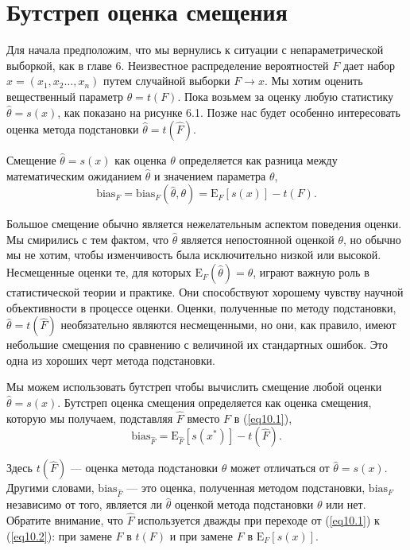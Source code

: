 \section{Бутстреп оценка смещения}

Для начала предположим, что мы вернулись к ситуации с непараметрической выборкой, как в главе 6. Неизвестное распределение вероятностей $F$ дает набор $x = (x_1, x_2 \dots, x_n)$ путем случайной выборки $F \rightarrow x$. Мы хотим оценить вещественный параметр $\theta = t(F)$. Пока возьмем за оценку любую статистику $\hat{\theta} = s(x)$, как показано на рисунке 6.1. Позже нас будет особенно интересовать оценка метода подстановки $\hat{\theta} = t(\hat{F})$.

Смещение $\hat{\theta} = s(x)$ как оценка $\theta$ определяется как разница между математическим ожиданием $\hat{\theta}$ и значением параметра $\theta$,
\begin{equation}\label{eq10.1} 
    \text{bias}_{F} = \text{bias}_{F}(\hat{\theta}, \theta) = \mathrm{E}_{F}[s(x)] - t(F).
\end{equation}

Большое смещение обычно является нежелательным аспектом поведения оценки. Мы смирились с тем фактом, что $\hat{\theta}$ является непостоянной оценкой $\theta$, но обычно мы не хотим, чтобы изменчивость была исключительно низкой или высокой. Несмещенные оценки те, для которых $\mathrm{E}_{F}(\hat{\theta}) = \theta$, играют важную роль в статистической теории и практике. Они способствуют хорошему чувству научной объективности в процессе оценки. Оценки, полученные по методу подстановки, $\hat{\theta} = t(\hat{F})$ необязательно являются несмещенными, но они, как правило, имеют небольшие смещения по сравнению с величиной их стандартных ошибок. Это одна из хороших черт метода подстановки.

Мы можем использовать бутстреп чтобы вычислить смещение любой оценки $\hat{\theta} = s(x)$. Бутстреп оценка смещения определяется как оценка смещения, которую мы получаем, подставляя $\hat{F}$ вместо $F$ в (\ref{eq10.1}),
\begin{equation}\label{eq10.2} 
    \text{bias}_{\hat{F}} = \mathrm{E}_{\hat{F}}[s(x^{*})] - t(\hat{F}).
\end{equation}

Здесь $t(\hat{F})$ --- оценка метода подстановки $\theta$ может отличаться от $\hat{\theta} = s(x)$. Другими словами, $\text{bias}_{\hat{F}}$ --- это оценка, полученная методом подстановки, $\text{bias}_{F}$ независимо от того, является ли $\hat{\theta}$ оценкой метода подстановки $\theta$ или нет. Обратите внимание, что $\hat{F}$ используется дважды при переходе от (\ref{eq10.1}) к (\ref{eq10.2}): при замене $F$ в $t(F)$ и при замене $F$ в $\mathrm{E}_{F}[s(x)]$.

